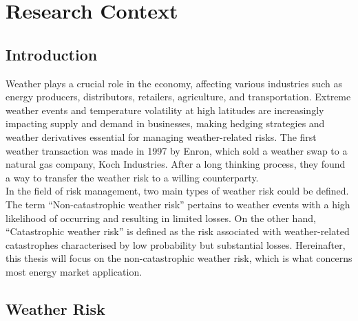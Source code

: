 %

\chapter{Research Context}
\label{ch:weather_derivatives}

\section{Introduction}
\label{sec:weather_intro}

    Weather plays a crucial role in the economy, affecting various industries such as energy producers,
    distributors, retailers, agriculture, and transportation.
    Extreme weather events and temperature volatility at high latitudes are increasingly impacting supply and demand
    in businesses, making hedging strategies and weather derivatives essential for managing weather-related risks.
    The first weather transaction was made in 1997 by Enron,
    which sold a weather swap to a natural gas company, Koch Industries.
    After a long thinking process,
    they found a way to transfer the weather risk to a willing counterparty\cite{barrieu_primer_2010}.\\

    In the field of risk management, two main types of weather risk could be defined\cite{leggio_using_2007}.
    The term ``Non-catastrophic weather risk'' pertains to weather events with a high likelihood
    of occurring and resulting in limited losses.
    On the other hand, ``Catastrophic weather risk'' is defined as the risk associated with weather-related catastrophes
    characterised by low probability but substantial losses.
    Hereinafter, this thesis will focus on the non-catastrophic weather risk,
    which is what concerns most energy market application.


\section{Weather Risk}
\label{sec:weather_risk}

